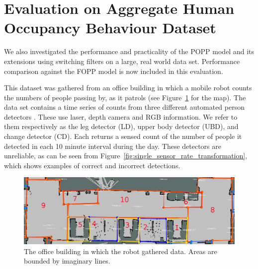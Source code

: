 \section{Evaluation on Aggregate Human Occupancy Behaviour Dataset}
\label{sec:evareal}

We also investigated the performance and practicality of the POPP model and its extensions using switching filters on a large, real world data set. Performance comparison against the FOPP model is now included in this evaluation.

This dataset was gathered from an office building in which a mobile robot counts the numbers of people passing by, as it patrols (see Figure~\ref{fig:map_popp_independent_test} for the map). The data set contains a time series of counts from three different automated person detectors \cite{dondrup2015real}. These use laser, depth camera and RGB information. We refer to them respectively as the leg detector (LD), upper body detector (UBD), and change detector (CD). Each returns a sensed count of the number of people it detected in each 10 minute interval during the day. These detectors are unreliable, as can be seen from Figure~\ref{fig:single_sensor_rate_transformation}, which shows examples of correct and incorrect detections.

\begin{figure}[t]
	\centering
	\includegraphics[width=0.95\columnwidth]{./figures/map_popp.png}
	\caption{The office building in which the robot gathered data. Areas are bounded by imaginary lines.}
	\label{fig:map_popp_independent_test}
\end{figure}

